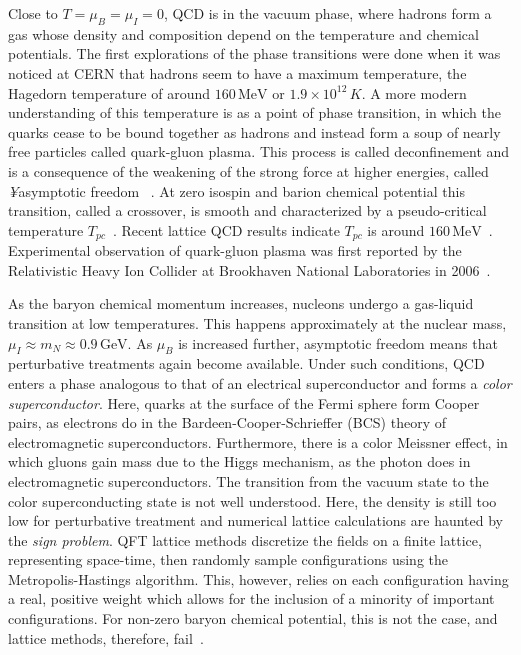Close to $T = \mu_B = \mu_I = 0$, QCD is in the vacuum phase, where hadrons form a gas whose density and composition depend on the temperature and chemical potentials.
The first explorations of the phase transitions were done when it was noticed at CERN that hadrons seem to have a maximum temperature, the Hagedorn temperature of around $160\,\text{MeV}$ or $1.9\times 10^{12} \, K$.
A more modern understanding of this temperature is as a point of phase transition, in which the quarks cease to be bound together as hadrons and instead form a soup of nearly free particles called quark-gluon plasma.
This process is called deconfinement and is a consequence of the weakening of the strong force at higher energies, called \emph¥{asymptotic freedom}
~\autocite{hagedornHadronicMatterBoiling1968,cabibboExponentialHadronicSpectrum1975}.
At zero isospin and barion chemical potential this transition, called a crossover, is smooth and characterized by a pseudo-critical temperature $T_{pc}$~\autocite{fukushimaPhaseDiagramDense2010}.
Recent lattice QCD results indicate $T_{pc}$ is around $160\, \text{MeV}$~\autocite{borsanyiThereStillAny2010}.
Experimental observation of quark-gluon plasma was first reported by the Relativistic Heavy Ion Collider at Brookhaven National Laboratories in 2006~\autocite{adcoxFormationDensePartonic2005,backPHOBOSPerspectiveDiscoveries2005}.

As the baryon chemical momentum increases, nucleons undergo a gas-liquid transition at low temperatures.
This happens approximately at the nuclear mass, $\mu_I \approx m_N \approx 0.9 \, \text{GeV}$.
As $\mu_B$ is increased further, asymptotic freedom means that perturbative treatments again become available.
Under such conditions, QCD enters a phase analogous to that of an electrical superconductor and forms a \emph{color superconductor}.
Here, quarks at the surface of the Fermi sphere form Cooper pairs, as electrons do in the Bardeen-Cooper-Schrieffer (BCS) theory of electromagnetic superconductors.
Furthermore, there is a color Meissner effect, in which gluons gain mass due to the Higgs mechanism, as the photon does in electromagnetic superconductors.
The transition from the vacuum state to the color superconducting state is not well understood.
Here, the density is still too low for perturbative treatment and numerical lattice calculations are haunted by the \emph{sign problem}.
QFT lattice methods discretize the fields on a finite lattice, representing space-time, then randomly sample configurations using the Metropolis-Hastings algorithm.
This, however, relies on each configuration having a real, positive weight which allows for the inclusion of a minority of important configurations.
For non-zero baryon chemical potential, this is not the case, and lattice methods, therefore, fail~\autocite{troyerComputationalComplexityFundamental2005}.

